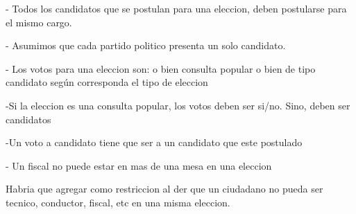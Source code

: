 - Todos los candidatos que se postulan para una eleccion, deben postularse para el mismo cargo.

- Asumimos que cada partido politico presenta un solo candidato.

- Los votos para una eleccion son: o bien consulta popular o bien de tipo candidato según corresponda el tipo de eleccion

-Si la eleccion es una consulta popular, los votos deben ser si/no. Sino, deben ser candidatos

-Un voto a candidato tiene que ser a un candidato que este postulado

- Un fiscal no puede estar en mas de una mesa en una eleccion

Habria que agregar como restriccion al der que un ciudadano no pueda ser tecnico, conductor, fiscal, etc en una misma eleccion.